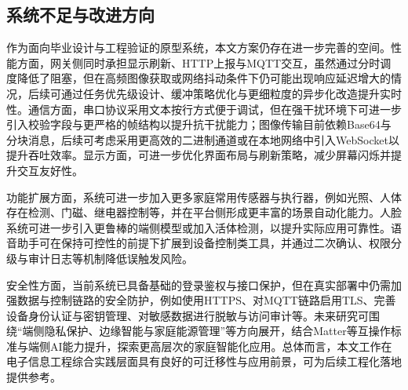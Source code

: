 \subsection{系统不足与改进方向}
\par 作为面向毕业设计与工程验证的原型系统，本文方案仍存在进一步完善的空间。性能方面，网关侧同时承担显示刷新、HTTP上报与MQTT交互，虽然通过分时调度降低了阻塞，但在高频图像获取或网络抖动条件下仍可能出现响应延迟增大的情况，后续可通过任务优先级设计、缓冲策略优化与更细粒度的异步化改造提升实时性。通信方面，串口协议采用文本按行方式便于调试，但在强干扰环境下可进一步引入校验字段与更严格的帧结构以提升抗干扰能力；图像传输目前依赖Base64与分块消息，后续可考虑采用更高效的二进制通道或在本地网络中引入WebSocket以提升吞吐效率。显示方面，可进一步优化界面布局与刷新策略，减少屏幕闪烁并提升交互友好性。
\par 功能扩展方面，系统可进一步加入更多家庭常用传感器与执行器，例如光照、人体存在检测、门磁、继电器控制等，并在平台侧形成更丰富的场景自动化能力。人脸系统可进一步引入更鲁棒的端侧模型或加入活体检测，以提升实际应用可靠性。语音助手可在保持可控性的前提下扩展到设备控制类工具，并通过二次确认、权限分级与审计日志等机制降低误触发风险。
\par 安全性方面，当前系统已具备基础的登录鉴权与接口保护，但在真实部署中仍需加强数据与控制链路的安全防护，例如使用HTTPS、对MQTT链路启用TLS、完善设备身份认证与密钥管理、对敏感数据进行脱敏与访问审计等。未来研究可围绕“端侧隐私保护、边缘智能与家庭能源管理”等方向展开，结合Matter等互操作标准与端侧AI能力提升，探索更高层次的家庭智能化应用。总体而言，本文工作在电子信息工程综合实践层面具有良好的可迁移性与应用前景，可为后续工程化落地提供参考。
